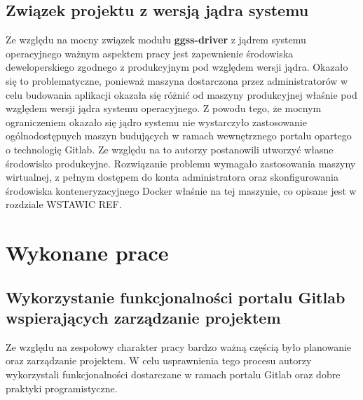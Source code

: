 \section{Związek projektu z wersją jądra systemu}
Ze względu na mocny związek modułu \textbf{ggss-driver} z jądrem systemu operacyjnego ważnym aspektem pracy jest zapewnienie środowiska deweloperskiego zgodnego z produkcyjnym pod względem wersji jądra. Okazało się to problematyczne, ponieważ maszyna dostarczona przez administratorów w celu budowania aplikacji okazała się różnić od maszyny produkcyjnej właśnie pod względem wersji jądra systemu operacyjnego. Z powodu tego, że mocnym ograniczeniem okazało się jądro systemu nie wystarczyło zastosowanie ogólnodostępnych maszyn budujących w ramach wewnętrznego portalu opartego o technologię Gitlab. Ze względu na to autorzy postanowili utworzyć własne środowisko produkcyjne. Rozwiązanie problemu wymagało zastosowania maszyny wirtualnej, z pełnym dostępem do konta administratora oraz skonfigurowania środowiska konteneryzacyjnego Docker właśnie na tej maszynie, co opisane jest w rozdziale WSTAWIC REF.



\chapter{Wykonane prace}
\label{cha:prace}

\section{Wykorzystanie funkcjonalności portalu Gitlab wspierających zarządzanie projektem}

Ze względu na zespołowy charakter pracy bardzo ważną częścią było planowanie oraz zarządzanie projektem. W celu usprawnienia tego procesu autorzy wykorzystali funkcjonalności dostarczane w ramach portalu Gitlab oraz dobre praktyki programistyczne. \par


